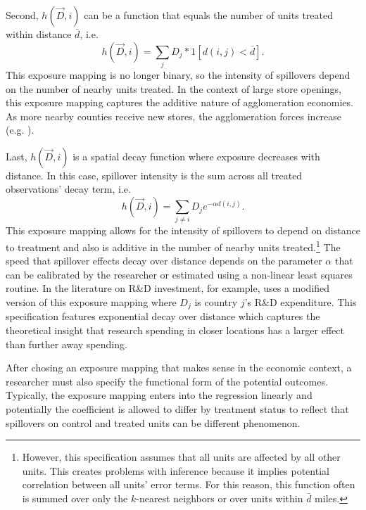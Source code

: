 \documentclass[11pt]{article}
\begin{document}
\begin{example}
    Second, $h(\vec{D}, i)$ can be a function that equals the number of units treated within distance $\bar{d}$, i.e. \begin{equation}\label{eq:h_within_additive}
        h(\vec{D}, i) = \sum_{j} D_j * 1[ d(i,j) < \bar{d} ].
    \end{equation}
    This exposure mapping is no longer binary, so the intensity of spillovers depend on the number of nearby units treated. In the context of large store openings, this exposure mapping captures the additive nature of agglomeration economies. As more nearby counties receive new stores, the agglomeration forces increase (e.g. \citet{Basker_2005}).
\end{example}
    
\begin{example}
    Last, $h(\vec{D}, i)$ is a spatial decay function where exposure decreases with distance. In this case, spillover intensity is the sum across all treated observations' decay term, i.e. \begin{equation}\label{eq:h_decay}
        h(\vec{D}, i) = \sum_{j \neq i} D_j e^{-\alpha d(i,j)}.
    \end{equation} 
    This exposure mapping allows for the intensity of spillovers to depend on distance to treatment and also is additive in the number of nearby units treated.\footnote{However, this specification assumes that all units are affected by all other units. This creates problems with inference because it implies potential correlation between all units' error terms. For this reason, this function often is summed over only the $k$-nearest neighbors or over units within $\bar{d}$ miles.} The speed that spillover effects decay over distance depends on the parameter $\alpha$ that can be calibrated by the researcher or estimated using a non-linear least squares routine. In the literature on R\&D investment, for example, \citet{Keller_2002} uses a modified version of this exposure mapping where $D_j$ is country $j$'s R\&D expenditure. This specification features exponential decay over distance which captures the theoretical insight that research spending in closer locations has a larger effect than further away spending.
\end{example}

After chosing an exposure mapping that makes sense in the economic context, a researcher must also specify the functional form of the potential outcomes. Typically, the exposure mapping enters into the regression linearly and potentially the coefficient is allowed to differ by treatment status to reflect that spillovers on control and treated units can be different phenomenon. 
\end{document}
